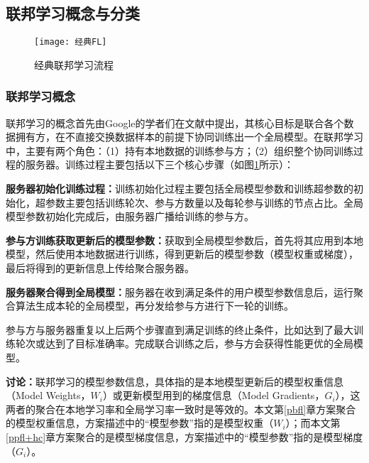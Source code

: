 \subsection{联邦学习概念与分类}
\begin{figure}
	\centering
	\texttt{[image: 经典FL]}
	\caption{经典联邦学习流程}
	\label{FL}
\end{figure}
\subsubsection{联邦学习概念}
联邦学习的概念首先由Google的学者们在文献\parencite{mcmahan2017communication}中提出，其核心目标是联合各个数据拥有方，在不直接交换数据样本的前提下协同训练出一个全局模型。在联邦学习中，主要有两个角色：（1）持有本地数据的训练参与方；（2）组织整个协同训练过程的服务器。训练过程主要包括以下三个核心步骤（如图\ref{FL}所示）：
\begin{compactenum}
	\item \textbf{服务器初始化训练过程：}训练初始化过程主要包括全局模型参数和训练超参数的初始化，超参数主要包括训练轮次、参与方数量以及每轮参与训练的节点占比。全局模型参数初始化完成后，由服务器广播给训练的参与方。
	\item \textbf{参与方训练获取更新后的模型参数：}获取到全局模型参数后，首先将其应用到本地模型，然后使用本地数据进行训练，得到更新后的模型参数（模型权重或梯度），最后将得到的更新信息上传给聚合服务器。
	\item \textbf{服务器聚合得到全局模型：}服务器在收到满足条件的用户模型参数信息后，运行聚合算法生成本轮的全局模型，再分发给参与方进行下一轮的训练。
\end{compactenum}

参与方与服务器重复以上后两个步骤直到满足训练的终止条件，比如达到了最大训练轮次或达到了目标准确率。完成联合训练之后，参与方会获得性能更优的全局模型。

\textbf{讨论：}联邦学习的模型参数信息，具体指的是本地模型更新后的模型权重信息（Model Weights，$W_i$）或更新模型用到的梯度信息（Model Gradients，$G_i$），这两者的聚合在本地学习率和全局学习率一致时是等效的。本文第\ref{pbfl}章方案聚合的模型权重信息，方案描述中的“模型参数”指的是模型权重（$W_i$）；而本文第\ref{ppfl+hc}章方案聚合的是模型梯度信息，方案描述中的“模型参数”指的是模型梯度（$G_i$）。

